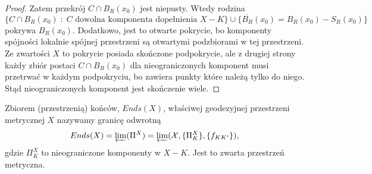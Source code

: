 \begin{example}[m]
\begin{proof}
      Zatem przekrój $C\cap B_R(x_0)$ jest niepusty. Wtedy rodzina 
      $$\{C\cap B_R(x_0)\;:\;C\text{ dowolna komponenta dopełnienia }X-K\}\cup \{\overline{B_R}(x_0)=B_R(x_0)-S_R(x_0)\}$$
      pokrywa $B_R(x_0)$. Dodatkowo, jest to otwarte pokrycie, bo komponenty spójności lokalnie spójnej przestrzeni są otwartymi podzbiorami w tej przestrzeni. Ze zwartości $X$ to pokrycie posiada skończone podpokrycie, ale z drugiej strony każdy zbiór postaci $C\cap B_R(x_0)$ dla nieograniczonych komponent musi przetrwać w każdym podpokryciu, bo zawiera punkty które należą tylko do niego. Stąd nieograniczonych komponent jest skończenie wiele.
    \end{proof}
\end{example}

\begin{definition}{}{}
  Zbiorem (przestrzenią) końców, $Ends(X)$, właściwej geodezyjnej przestrzeni metrycznej $X$ nazywamy granicę odwrotną
  $$Ends(X)=\varprojlim(\Pi^X)=\varprojlim(\mathcal{X}, \{\Pi_K^X\}, \{f_{KK'}\}),$$
  gdzie $\Pi_K^X$ to nieograniczone komponenty w $X-K$.  Jest to zwarta przestrzeń metryczna.
\end{definition}




